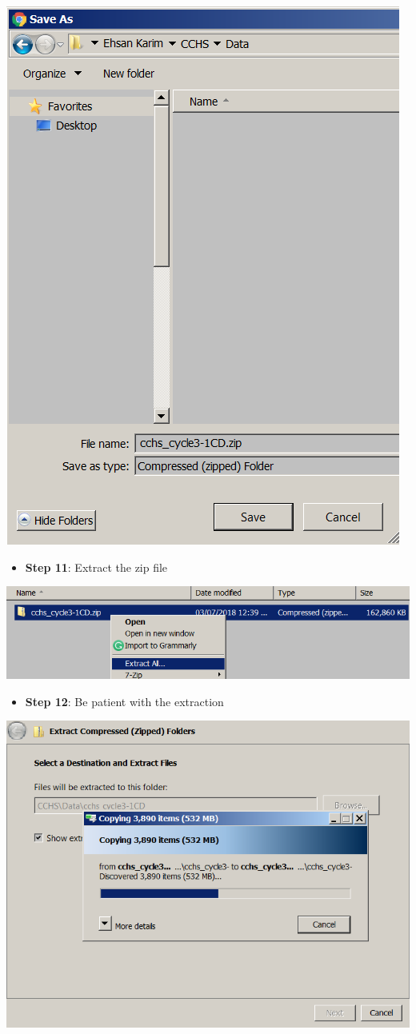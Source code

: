 \documentclass[
]{book}
\providecommand{\tightlist}{%
  \setlength{\itemsep}{0pt}\setlength{\parskip}{0pt}}
\begin{document}
\includegraphics[width=0.65\linewidth]{images/abacus10}

\begin{itemize}
\tightlist
\item
  \textbf{Step 11}: Extract the zip file
\end{itemize}

\includegraphics[width=0.65\linewidth]{images/abacus11}

\begin{itemize}
\tightlist
\item
  \textbf{Step 12}: Be patient with the extraction
\end{itemize}

\includegraphics[width=0.65\linewidth]{images/abacus12}
\end{document}

